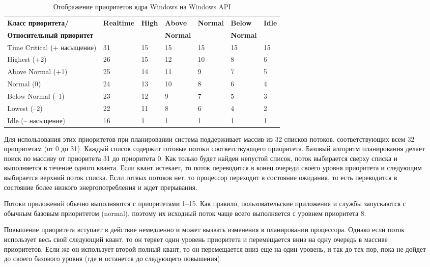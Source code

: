 \begin{table}[H]
    \centering
    \caption{Отображение приоритетов ядра Windows на Windows API}
    \begin{tabular}{|l|l|l|l|l|l|l|}
        \hline
        \textbf{Класс приоритета/} &
        \textbf{Realtime} &
        \textbf{High} &
        \textbf{Above} &
        \textbf{Normal} &
        \textbf{Below} &
        \textbf{Idle} \\
        \textbf{Относительный приоритет} & & &
        \textbf{Normal} & & \textbf{Normal} & \\
        \hline
        \hline
        Time Critical (+ насыщение) & 31 & 15 & 15 & 15 & 15 & 15 \\
        \hline
        Highest (+2) & 26 & 15 & 12 & 10 & 8 & 6 \\
        \hline
        Above Normal (+1) & 25 & 14 & 11 & 9 & 7 & 5 \\
        \hline
        Normal (0) & 24 & 13 & 10 & 8 & 6 & 4 \\
        \hline
        Below Normal (--1) & 23 & 12 & 9 & 7 & 5 & 3 \\
        \hline
        Lowest (--2) & 22 & 11 & 8 & 6 & 4 & 2 \\
        \hline
        Idle (-- насыщение) & 16 & 1 & 1 & 1 &1 & 1 \\
        \hline
    \end{tabular}
\end{table}

Для использования этих приоритетов при планировании система
поддерживает массив из 32 списков потоков, соответствующих всем
32 приоритетам (от 0 до 31). Каждый список содержит готовые потоки
соответствующего приоритета. Базовый алгоритм планирования делает
поиск по массиву от приоритета 31 до приоритета 0. Как только будет
найден непустой список, поток выбирается сверху списка и выполняется
в течение одного кванта. Если квант истекает, то поток переводится в
конец очереди своего уровня приоритета и следующим выбирается верхний
поток списка. Если готвых потоков нет, то процессор переходит в
состояние ожидания, то есть переводится в состояние более низкого
энергопотребления и ждет прерывания.

Потоки приложений обычно выполняются с приоритетами 1–15.
Как правило, пользовательские приложения и службы запускаются
с обычным базовым приоритетом (normal), поэтому их исходный
поток чаще всего выполняется с уровнем приоритета 8.

Повышение приоритета вступает в действие немедленно и может
вызвать изменения в планировании процессора. Однако если поток
использует весь свой следующий квант, то он теряет один уровень
приоритета и перемещается вниз на одну очередь в массиве приоритетов.
Если же он использует второй полный квант, то он перемещается вниз
еще на один уровень, и так до тех пор, пока не дойдет до своего
базового уровня (где и останется до следующего повышения).

